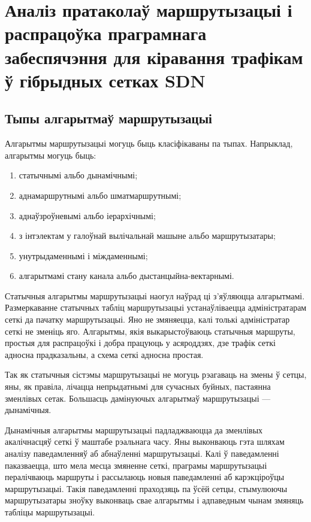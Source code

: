 \section{Аналіз пратаколаў маршрутызацыі і распрацоўка праграмнага забеспячэння для кіравання трафікам ў гібрыдных сетках SDN}

\subsection{Тыпы алгарытмаў маршрутызацыі}

Алгарытмы маршрутызацыі могуць быць класіфікаваны па тыпах.
Напрыклад, алгарытмы могуць быць:
\begin{enumerate}
    \item статычнымі альбо дынамічнымі;
    \item аднамаршрутнымі альбо шматмаршрутнымі;
    \item аднаўзроўневымі альбо іерархічнымі;
    \item з інтэлектам у галоўнай вылічальнай машыне альбо маршрутызатары;
    \item унутрыдаменнымі і міждаменнымі;
    \item алгарытмамі стану канала альбо дыстанцыйна-вектарнымі.
\end{enumerate}

Статычныя алгарытмы маршрутызацыі наогул наўрад ці з'яўляюцца
алгарытмамі.
Размеркаванне статычных табліц маршрутызацыі
устанаўліваецца адміністратарам сеткі да пачатку маршрутызацыі. Яно не
змяняецца, калі толькі адміністратар сеткі не зменіць яго. Алгарытмы,
якія выкарыстоўваюць статычныя маршруты, простыя для распрацоўкі і добра
працуюць у асяроддзях, дзе трафік сеткі адносна прадказальны, а схема
сеткі адносна простая.

Так як статычныя сістэмы маршрутызацыі не могуць рэагаваць на
змены ў сетцы, яны, як правіла, лічацца непрыдатнымі для сучасных
буйных, пастаянна зменлівых сетак. Большасць дамінуючых
алгарытмаў маршрутызацыі --- дынамічныя.

Дынамічныя алгарытмы маршрутызацыі падладжваюцца да зменлівых акалічнасцяў сеткі ў маштабе рэальнага часу. Яны выконваюць гэта шляхам аналізу паведамленняў аб абнаўленні маршрутызацыі. Калі ў паведамленні паказваецца, што мела месца змяненне сеткі, праграмы маршрутызацыі пералічваюць маршруты і рассылаюць новыя паведамленні аб карэкціроўцы маршрутызацыі. Такія паведамленні праходзяць па ўсёй сетцы, стымулюючы маршрутызатары зноўку выконваць свае алгарытмы і адпаведным чынам змяняць табліцы маршрутызацыі.

